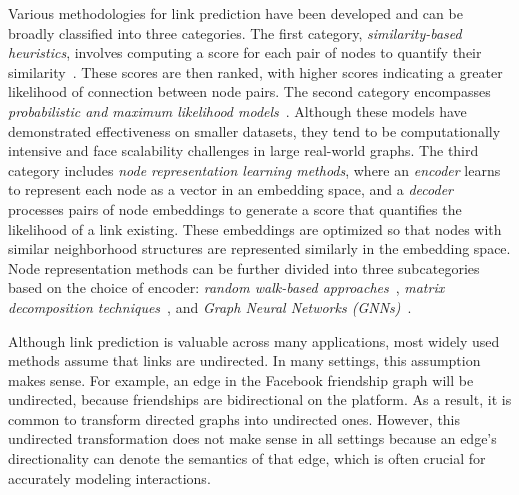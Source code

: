 \documentclass{article}
\begin{document}
Various methodologies for link prediction have been developed and can be broadly classified into three categories. The first category, \emph{similarity-based heuristics}, involves computing a score for each pair of nodes to quantify their similarity~\citep{wang2007local}. These scores are then ranked, with higher scores indicating a greater likelihood of connection between node pairs. The second category encompasses \emph{probabilistic and maximum likelihood models}~\citep{wang2007local, clauset2008hierarchical, guimera2009missing}. Although these models have demonstrated effectiveness on smaller datasets, they tend to be computationally intensive and face scalability challenges in large real-world graphs. The third category includes \emph{node representation learning methods}, where an \emph{encoder} learns to represent each node as a vector in an embedding space, and a \emph{decoder} processes pairs of node embeddings to generate a score that quantifies the likelihood of a link existing. These embeddings are optimized so that nodes with similar neighborhood structures are represented similarly in the embedding space. Node representation methods can be further divided into three subcategories based on the choice of encoder: \emph{random walk-based approaches}~\citep{perozzi2014deepwalk, trouillon2016complex, cao2018link, kazemi2018simple}, \emph{matrix decomposition techniques}~\citep{acar2009link, kazemi2018simple}, and \emph{Graph Neural Networks (GNNs)}~\citep{kipf2016semi, hamilton2017inductive, ying2018graph, velivckovic2017graph}.

Although link prediction is valuable across many applications, most widely used methods assume that links are undirected. In many settings, this assumption makes sense. For example, an edge in the Facebook friendship graph will be undirected, because friendships are bidirectional on the platform. As a result, it is common to transform directed graphs into undirected ones. However, this undirected transformation does not make sense in all settings because an edge's directionality can denote the semantics of that edge, which is often crucial for accurately modeling interactions.
\end{document}
